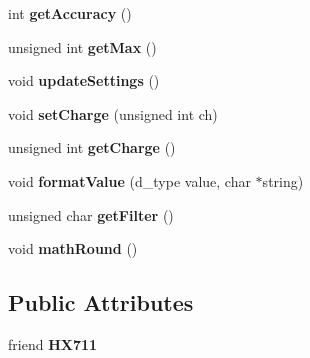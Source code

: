 \begin{DoxyCompactItemize}
\item 
\hypertarget{class_scales_class_ac28127378faf83575652fd0458f1daaa}{int {\bfseries get\-Accuracy} ()}\label{class_scales_class_ac28127378faf83575652fd0458f1daaa}

\item 
\hypertarget{class_scales_class_ae31220a10a1eafb34194647fede9deef}{unsigned int {\bfseries get\-Max} ()}\label{class_scales_class_ae31220a10a1eafb34194647fede9deef}

\item 
\hypertarget{class_scales_class_adc2471182082ad7b7de1fffe942670a0}{void {\bfseries update\-Settings} ()}\label{class_scales_class_adc2471182082ad7b7de1fffe942670a0}

\item 
\hypertarget{class_scales_class_a31965a783b3ea0c880a6736767f36c57}{void {\bfseries set\-Charge} (unsigned int ch)}\label{class_scales_class_a31965a783b3ea0c880a6736767f36c57}

\item 
\hypertarget{class_scales_class_a4a7354d6c64331313df0527b6a1cb9f0}{unsigned int {\bfseries get\-Charge} ()}\label{class_scales_class_a4a7354d6c64331313df0527b6a1cb9f0}

\item 
\hypertarget{class_scales_class_a30308cf7166fd857e38586e2b0b5460e}{void {\bfseries format\-Value} (d\-\_\-type value, char $\ast$string)}\label{class_scales_class_a30308cf7166fd857e38586e2b0b5460e}

\item 
\hypertarget{class_scales_class_a533910a443bcf1314b0ad0a54693bef0}{unsigned char {\bfseries get\-Filter} ()}\label{class_scales_class_a533910a443bcf1314b0ad0a54693bef0}

\item 
\hypertarget{class_scales_class_a7862afd4436aa071475e993c5a9b7efb}{void {\bfseries math\-Round} ()}\label{class_scales_class_a7862afd4436aa071475e993c5a9b7efb}

\end{DoxyCompactItemize}
\subsection*{Public Attributes}
\begin{DoxyCompactItemize}
\item 
\hypertarget{class_scales_class_a45be5fc6d0301fce6eb003e89e8bf64d}{friend {\bfseries H\-X711}}\label{class_scales_class_a45be5fc6d0301fce6eb003e89e8bf64d}

\end{DoxyCompactItemize}
